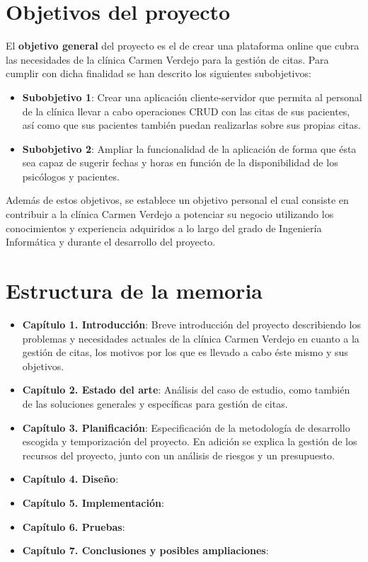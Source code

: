 \section{Objetivos del proyecto}
El \textbf{objetivo general} del proyecto es el de crear una plataforma online que cubra las necesidades de la clínica Carmen Verdejo para la gestión de citas. Para cumplir con dicha finalidad se han descrito los siguientes subobjetivos:

\begin{itemize}
    \item \textbf{Subobjetivo 1}: Crear una aplicación cliente-servidor que permita al personal de la clínica llevar a cabo operaciones CRUD con las citas de sus pacientes, así como que sus pacientes también puedan realizarlas sobre sus propias citas.
    \item \textbf{Subobjetivo 2}: Ampliar la funcionalidad de la aplicación de forma que ésta sea capaz de sugerir fechas y horas en función de la disponibilidad de los psicólogos y pacientes.
\end{itemize}

Además de estos objetivos, se establece un objetivo personal el cual consiste en contribuir a la clínica Carmen Verdejo a potenciar su negocio utilizando los conocimientos y experiencia adquiridos a lo largo del grado de Ingeniería Informática y durante el desarrollo del proyecto.

\section{Estructura de la memoria}
\begin{itemize}
    \item \textbf{Capítulo 1. Introducción}: Breve introducción del proyecto describiendo los problemas y necesidades actuales de la clínica Carmen Verdejo en cuanto a la gestión de citas, los motivos por los que es llevado a cabo éste mismo y sus objetivos.
    \item \textbf{Capítulo 2. Estado del arte}: Análisis del caso de estudio, como también de las soluciones generales y específicas para gestión de citas.
    \item \textbf{Capítulo 3. Planificación}: Especificación de la metodología de desarrollo escogida y temporización del proyecto. En adición se explica la gestión de los recursos del proyecto, junto con un análisis de riesgos y un presupuesto.
    \item \textbf{Capítulo 4. Diseño}:
    \item \textbf{Capítulo 5. Implementación}:
    \item \textbf{Capítulo 6. Pruebas}:
    \item \textbf{Capítulo 7. Conclusiones y posibles ampliaciones}:
\end{itemize}